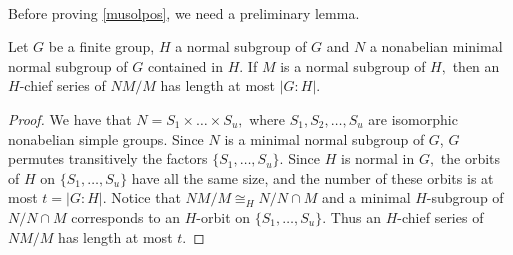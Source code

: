\documentclass{amsart}
\newcommand{\la}{\langle}
\newcommand{\ra}{\rangle}
\newtheorem{thm}{Theorem}
\newtheorem{cor}[thm]{Corollary}
\numberwithin{equation}{section}
\begin{document}


\

 Before proving \cref{musolpos}, we need a preliminary lemma.


\begin{lemma}\label{subseries}
	Let $G$ be a finite group, $H$ a normal subgroup of $G$ and $N$ a nonabelian minimal normal subgroup of $G$ contained in $H$. If $M$ is a normal subgroup of $H,$ then an $H$-chief series of $NM/M$ has length at most $|G:H|.$
\end{lemma}

\begin{proof}
	We have that $N=S_1\times \dots \times S_u,$ where $S_1,S_2,\dots,S_u$ are isomorphic nonabelian simple groups.
	Since $N$ is a minimal normal subgroup of $G$, $G$ permutes transitively the factors $\{S_1,\dots,S_u\}.$ Since $H$ is normal in $G,$ the orbits of $H$ on $\{S_1,\dots,S_u\}$ have all the same size, and the number of these orbits is at most $t=|G:H|.$ Notice that $NM/M \cong_H N/N\cap M$ and a minimal $H$-subgroup of $N/N\cap M$ corresponds to an $H$-orbit on $\{S_1,\dots,S_u\}.$ Thus an $H$-chief series of $NM/M$ has length at most $t.$
\end{proof}
 
\end{document}
